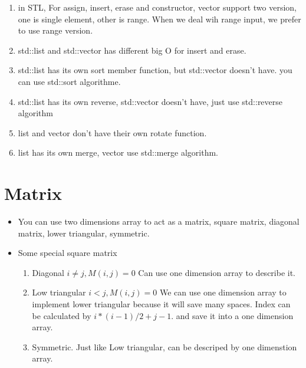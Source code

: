 \documentclass[a4paper,12pt,twoside]{book}
\begin{document}
\begin{itemize}
\begin{enumerate}
\item in STL,  For assign, insert, erase and constructor, vector support two version, one is single element, other is range.  When we deal wih range input, we prefer to use range version. 
\item std::list and std::vector has different big O for insert and erase.
\item std::list has its own sort member function, but std::vector doesn't have. you can use std::sort algorithme. 
\item std::list has its own reverse,  std::vector doesn't have, just use std::reverse algorithm
\item list and vector don't have their own rotate function.
\item list has its own merge, vector use std::merge algorithm.

\end{enumerate}







\end{itemize}
\section{Matrix}
\begin{itemize}
\item You can use two dimensions array to act as a matrix, square matrix, diagonal matrix, lower triangular, symmetric. 
\item Some special square matrix
\begin{enumerate}
\item Diagonal  $i\neq j, M(i,j) = 0$ Can use one dimension array to describe it. 
\item Low triangular $i<j, M(i,j) = 0$ We can use one dimension array to implement lower triangular because it will save many spaces.  Index can be calculated by $i*(i-1)/2+j-1$. and save it into a one dimension array. 
\item Symmetric. Just like Low triangular, can be descriped by one dimenstion array. 
\end{enumerate}
\end{itemize}
\end{document}
